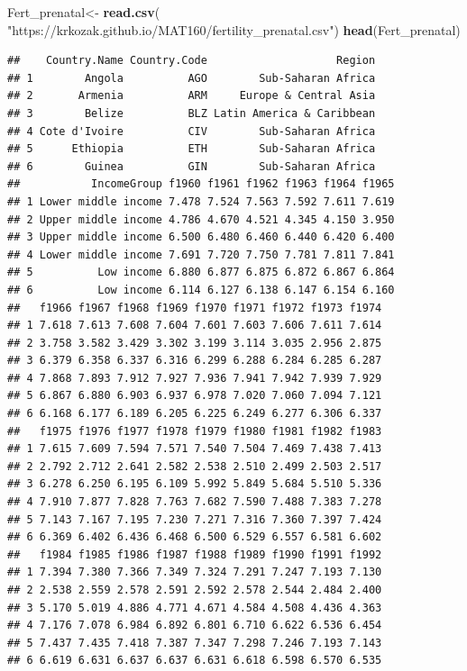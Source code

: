 \documentclass[
]{book}
\newenvironment{Shaded}{\begin{snugshade}}{\end{snugshade}}
\newcommand{\KeywordTok}[1]{\textcolor[rgb]{0.13,0.29,0.53}{\textbf{#1}}}
\newcommand{\NormalTok}[1]{#1}
\newcommand{\StringTok}[1]{\textcolor[rgb]{0.31,0.60,0.02}{#1}}
\begin{document}
\begin{Shaded}
\begin{Highlighting}[]
\NormalTok{Fert_prenatal<-}\StringTok{ }\KeywordTok{read.csv}\NormalTok{(}
  \StringTok{"https://krkozak.github.io/MAT160/fertility_prenatal.csv"}\NormalTok{)}
\KeywordTok{head}\NormalTok{(Fert_prenatal)}
\end{Highlighting}
\end{Shaded}

\begin{verbatim}
##    Country.Name Country.Code                    Region
## 1        Angola          AGO        Sub-Saharan Africa
## 2       Armenia          ARM     Europe & Central Asia
## 3        Belize          BLZ Latin America & Caribbean
## 4 Cote d'Ivoire          CIV        Sub-Saharan Africa
## 5      Ethiopia          ETH        Sub-Saharan Africa
## 6        Guinea          GIN        Sub-Saharan Africa
##           IncomeGroup f1960 f1961 f1962 f1963 f1964 f1965
## 1 Lower middle income 7.478 7.524 7.563 7.592 7.611 7.619
## 2 Upper middle income 4.786 4.670 4.521 4.345 4.150 3.950
## 3 Upper middle income 6.500 6.480 6.460 6.440 6.420 6.400
## 4 Lower middle income 7.691 7.720 7.750 7.781 7.811 7.841
## 5          Low income 6.880 6.877 6.875 6.872 6.867 6.864
## 6          Low income 6.114 6.127 6.138 6.147 6.154 6.160
##   f1966 f1967 f1968 f1969 f1970 f1971 f1972 f1973 f1974
## 1 7.618 7.613 7.608 7.604 7.601 7.603 7.606 7.611 7.614
## 2 3.758 3.582 3.429 3.302 3.199 3.114 3.035 2.956 2.875
## 3 6.379 6.358 6.337 6.316 6.299 6.288 6.284 6.285 6.287
## 4 7.868 7.893 7.912 7.927 7.936 7.941 7.942 7.939 7.929
## 5 6.867 6.880 6.903 6.937 6.978 7.020 7.060 7.094 7.121
## 6 6.168 6.177 6.189 6.205 6.225 6.249 6.277 6.306 6.337
##   f1975 f1976 f1977 f1978 f1979 f1980 f1981 f1982 f1983
## 1 7.615 7.609 7.594 7.571 7.540 7.504 7.469 7.438 7.413
## 2 2.792 2.712 2.641 2.582 2.538 2.510 2.499 2.503 2.517
## 3 6.278 6.250 6.195 6.109 5.992 5.849 5.684 5.510 5.336
## 4 7.910 7.877 7.828 7.763 7.682 7.590 7.488 7.383 7.278
## 5 7.143 7.167 7.195 7.230 7.271 7.316 7.360 7.397 7.424
## 6 6.369 6.402 6.436 6.468 6.500 6.529 6.557 6.581 6.602
##   f1984 f1985 f1986 f1987 f1988 f1989 f1990 f1991 f1992
## 1 7.394 7.380 7.366 7.349 7.324 7.291 7.247 7.193 7.130
## 2 2.538 2.559 2.578 2.591 2.592 2.578 2.544 2.484 2.400
## 3 5.170 5.019 4.886 4.771 4.671 4.584 4.508 4.436 4.363
## 4 7.176 7.078 6.984 6.892 6.801 6.710 6.622 6.536 6.454
## 5 7.437 7.435 7.418 7.387 7.347 7.298 7.246 7.193 7.143
## 6 6.619 6.631 6.637 6.637 6.631 6.618 6.598 6.570 6.535

\end{verbatim}
\end{document}
